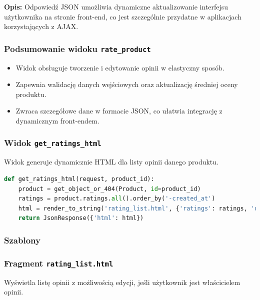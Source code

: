 \documentclass[12pt,a4paper,oneside]{article}
\theoremstyle{definition}
\numberwithin{equation}{section}
\begin{document}
\textbf{Opis:}  
Odpowiedź JSON umożliwia dynamiczne aktualizowanie interfejsu użytkownika na stronie front-end, co jest szczególnie przydatne w aplikacjach korzystających z AJAX.

\subsubsection*{Podsumowanie widoku \texttt{rate\_product}}
\begin{itemize}
    \item Widok obsługuje tworzenie i edytowanie opinii w elastyczny sposób.
    \item Zapewnia walidację danych wejściowych oraz aktualizację średniej oceny produktu.
    \item Zwraca szczegółowe dane w formacie JSON, co ułatwia integrację z dynamicznym front-endem.
\end{itemize}



\subsubsection*{Widok \texttt{get\_ratings\_html}}
Widok generuje dynamicznie HTML dla listy opinii danego produktu.

\begin{lstlisting}[language=Python, caption=Widok \texttt{get\_ratings\_html}]
def get_ratings_html(request, product_id):
    product = get_object_or_404(Product, id=product_id)
    ratings = product.ratings.all().order_by('-created_at')
    html = render_to_string('rating_list.html', {'ratings': ratings, 'user': request.user})
    return JsonResponse({'html': html})
\end{lstlisting}



\subsubsection{Szablony}

\subsubsection*{Fragment \texttt{rating\_list.html}}
Wyświetla listę opinii z możliwością edycji, jeśli użytkownik jest właścicielem opinii.
\end{document}
